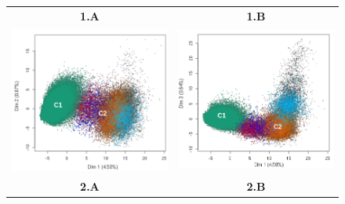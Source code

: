 \documentclass[12pt,a4paper]{article}
\begin{document}
\begin{figure}	
	\begin{tabular}{cc} 
		\textbf{1.A} & \textbf{1.B} \\
		\includegraphics[scale=0.4]{img/solatus_acp1.png} & \includegraphics[scale=0.4]{img/solatus_acp2.png} \\
		\textbf{2.A} & \textbf{2.B} \\

\end{tabular}
\end{figure}
\end{document}
